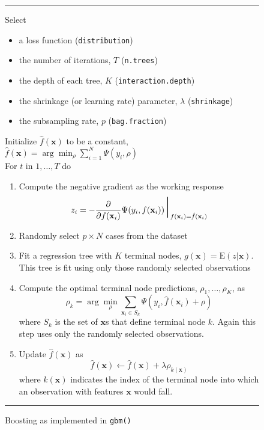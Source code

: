 \documentclass{article}
\newcommand{\EV}{\mathrm{E}}
\newcommand{\aRule}{\begin{center} \rule{5in}{1mm} \end{center}}
\begin{document}
\begin{figure}
\aRule
Select
\begin{itemize}
\item a loss function (\texttt{distribution})
\item the number of iterations, $T$ (\texttt{n.trees})
\item the depth of each tree, $K$ (\texttt{interaction.depth})
\item the shrinkage (or learning rate) parameter, $\lambda$
  (\texttt{shrinkage})
\item the subsampling rate, $p$ (\texttt{bag.fraction})
\end{itemize}
Initialize $\hat f(\mathbf{x})$ to be a constant, $\hat f(\mathbf{x}) = \arg \min_{\rho} \sum_{i=1}^N \Psi(y_i,\rho)$ \\
For $t$ in $1,\ldots,T$ do
\begin{enumerate}
\item Compute the negative gradient as the working response
    \begin{equation}
    z_i = -\frac{\partial}{\partial f(\mathbf{x}_i)} \Psi(y_i,f(\mathbf{x}_i)) \mbox{\Huge $|$}_{f(\mathbf{x}_i)=\hat f(\mathbf{x}_i)}
    \end{equation}
\item Randomly select $p\times N$ cases from the dataset
\item Fit a regression tree with $K$ terminal nodes,
  $g(\mathbf{x})=\EV(z|\mathbf{x})$. This tree is fit using only those
  randomly selected observations
\item Compute the optimal terminal node predictions, $\rho_1,\ldots,\rho_K$, as
    \begin{equation}
    \rho_k = \arg \min_{\rho} \sum_{\mathbf{x}_i\in S_k} \Psi(y_i,\hat f(\mathbf{x}_i)+\rho)
    \end{equation}
    where $S_k$ is the set of $\mathbf{x}$s that define terminal node
    $k$. Again this step uses only the randomly selected observations.
\item Update $\hat f(\mathbf{x})$ as
    \begin{equation}
    \hat f(\mathbf{x}) \leftarrow \hat f(\mathbf{x}) + \lambda\rho_{k(\mathbf{x})}
    \end{equation}
    where $k(\mathbf{x})$ indicates the index of the terminal node
    into which an observation with features $\mathbf{x}$ would fall.
\end{enumerate}
\aRule
\caption{Boosting as implemented in \texttt{gbm()}}
\label{fig:gbm}
\end{figure}
\end{document}
